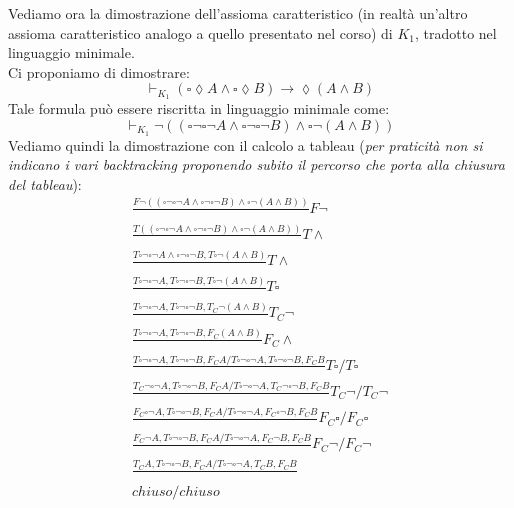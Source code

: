 \documentclass[a4paper,12pt, oneside]{book}
\begin{document}
\begin{esempio}
  Vediamo ora la dimostrazione dell'assioma caratteristico (in realtà
  un'altro assioma caratteristico analogo a quello presentato nel corso) di
  $K_1$, tradotto nel linguaggio minimale.\\
  Ci proponiamo di dimostrare:
  \[\vdash_{K_{1}}(\square\lozenge A\land\square\lozenge B)\to\lozenge(A\land
    B)\] 
  Tale formula può essere riscritta in linguaggio minimale come:
  \[\vdash_{K_{1}}\neg((\square\neg\square\neg A\land \square\neg\square\neg
    B)\land 
    \square\neg(A\land B))\]
  Vediamo quindi la dimostrazione con il calcolo a tableau (\textit{per
    praticità non si indicano i vari backtracking proponendo subito il percorso
    che porta alla chiusura del tableau}):
  \begin{gather*}
    \frac{F\neg((\square\neg\square\neg A\land \square\neg\square\neg B)\land
    \square\neg(A\land B))}{}F\neg\\
    \frac{T((\square\neg\square\neg A\land \square\neg\square\neg B)\land
    \square\neg(A\land B))}{}T\land\\
    \frac{T\square\neg\square\neg A\land \square\neg\square\neg B,T
    \square\neg(A\land B)}{}T\land\\
    \frac{T\square\neg\square\neg A,T \square\neg\square\neg B,T
    \square\neg(A\land B)}{}T\square\\
    \frac{T\square\neg\square\neg A,T \square\neg\square\neg B,T_C
    \neg(A\land B)}{}T_C\neg\\
    \frac{T\square\neg\square\neg A,T \square\neg\square\neg B,F_C(A\land
    B)}{}F_C\land\\
    \frac{T\square\neg\square\neg A,T \square\neg\square\neg
    B,F_CA/T\square\neg\square\neg A,T \square\neg\square\neg
    B,F_CB}{}T\square/T\square\\
    \frac{T_C\neg\square\neg A,T \square\neg\square\neg
    B,F_CA/T\square\neg\square\neg A,T_C\neg\square\neg
    B,F_CB}{}T_C\neg/T_C\neg\\
    \frac{F_C\square\neg A,T \square\neg\square\neg
    B,F_CA/T\square\neg\square\neg A,F_C\square\neg
    B,F_CB}{}F_C\square/F_C\square\\
    \frac{F_C\neg A,T \square\neg\square\neg
    B,F_CA/T\square\neg\square\neg A,F_C\neg
    B,F_CB}{}F_C\neg/F_C\neg\\
    \frac{T_CA,T \square\neg\square\neg
    B,F_CA/T\square\neg\square\neg A,T_C
    B,F_CB}{}\\
    chiuso/chiuso
  \end{gather*}
\end{esempio}
\newpage
\end{document}

